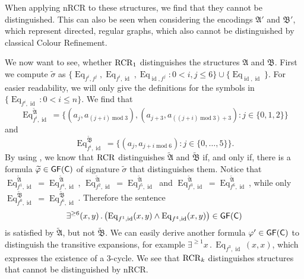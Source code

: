 When applying nRCR to these structures, we find that they cannot be distinguished.
This can also be seen when considering the encodings $\mathfrak A'$ and $\mathfrak B'$, which represent directed, regular graphs, which also cannot be distinguished by classical Colour Refinement.

We now want to see, whether $\operatorname{RCR}_1$ distinguishes the structures $\mathfrak A$ and $\mathfrak B$.
First we compute $\widetilde\sigma$ as $\{\operatorname{Eq}_{f^i,f^j}, \operatorname{Eq}_{f^i,\operatorname{id}}, \operatorname{Eq}_{\operatorname{id},f^j} : 0< i,j \leq 6\}\cup\{\operatorname{Eq}_{\operatorname{id},\operatorname{id}}\}$. 
For easier readability, we will only give the definitions for the symbols in $\{\operatorname{Eq}_{f^i,\operatorname{id}} : 0 < i \leq n\}$. 
We find that 
$$\operatorname{Eq}_{f^i,\operatorname{id}}^{\widetilde{\mathfrak A}} = \{(a_j,a_{(j+i) \operatorname{mod} 3}),(a_{j+3}, a_{((j+i)\operatorname{mod} 3)+3}) : j \in \{0,1,2\}\}$$
and 
$$\operatorname{Eq}_{f^i,\operatorname{id}}^{\widetilde{\mathfrak B}} = \{(a_j,a_{j+i \operatorname{mod} 6}) : j \in \{0,\dots,5\}\}.$$
By using \cite{scheidt2025ColorRefinement}, we know that $\operatorname{RCR}$ distinguishes $\widetilde{\mathfrak A}$ and $\widetilde{\mathfrak B}$ if, and only if, there is a formula $\widetilde{\varphi}\in\mathsf{GF}(\mathsf{C})$ of signature $\widetilde{\sigma}$ that distinguishes them.
Notice that $\operatorname{Eq}_{f^1,\operatorname{id}}^{\widetilde{\mathfrak A}}=\operatorname{Eq}_{f^4,\operatorname{id}}^{\widetilde{\mathfrak A}}$, $\operatorname{Eq}_{f^2,\operatorname{id}}^{\widetilde{\mathfrak A}}=\operatorname{Eq}_{f^5,\operatorname{id}}^{\widetilde{\mathfrak A}}$ and $\operatorname{Eq}_{f^3,\operatorname{id}}^{\widetilde{\mathfrak A}}=\operatorname{Eq}_{f^6,\operatorname{id}}^{\widetilde{\mathfrak A}}$, while only $\operatorname{Eq}_{f^0,\operatorname{id}}^{\widetilde{\mathfrak B}}=\operatorname{Eq}_{f^6,\operatorname{id}}^{\widetilde{\mathfrak B}}$.
Therefore the sentence 
$$\exists^{\geq 6}(x,y)\operatorname{.}\left(\operatorname{Eq}_{f^1,\operatorname{id}}(x,y) \land \operatorname{Eq}_{f^4,\operatorname{id}}(x,y)\right)\in \mathsf{GF}(\mathsf{C})$$ 
is satisfied by $\widetilde{\mathfrak A}$, but not $\widetilde{\mathfrak B}$.
We can easily derive another formula $\varphi'\in \mathsf{GF}(\mathsf{C})$ to distinguish the transitive expansions, for example $\exists^{\geq 1} x\operatorname{.} \operatorname{Eq}_{f^3, \operatorname{id}}(x, x)$, which expresses the existence of a $3$-cycle.
We see that $\operatorname{RCR}_k$ distinguishes structures that cannot be distinguished by nRCR.

